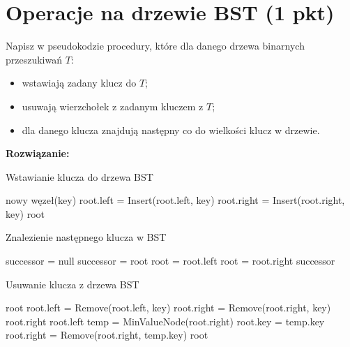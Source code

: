 \documentclass[12pt]{article}
\begin{document}
	\section{Operacje na drzewie BST (1 pkt)}
    Napisz w pseudokodzie procedury, które dla danego drzewa binarnych przeszukiwań \( T \):
\begin{itemize}
    \item wstawiają zadany klucz do \( T \);
    \item usuwają wierzchołek z zadanym kluczem z \( T \);
    \item dla danego klucza znajdują następny co do wielkości klucz w drzewie.
\end{itemize}
	\textcolor{tokyoNightGreen}{\textbf{\large Rozwiązanie:}}
\begin{algorithm}
\caption{Wstawianie klucza do drzewa BST}
\begin{algorithmic}[1]
        \State \Return nowy węzeł(key)
    \EndIf
        \State root.left = Insert(root.left, key)
    \Else
            \State root.right = Insert(root.right, key)
        \EndIf
    \EndIf
    \State \Return root
\EndFunction
\end{algorithmic}
\end{algorithm}

\begin{algorithm}
\caption{Znalezienie następnego klucza w BST}
\begin{algorithmic}[1]
    \State successor = null
            \State successor = root
            \State root = root.left
        \Else
            \State root = root.right
        \EndIf
    \EndWhile
    \State \Return successor
\EndFunction
\end{algorithmic}
\end{algorithm}

\begin{algorithm}
\caption{Usuwanie klucza z drzewa BST}
\begin{algorithmic}[1]
        \State \Return root
    \EndIf
        \State root.left = Remove(root.left, key)
    \Else
            \State root.right = Remove(root.right, key)
        \Else
                \State \Return root.right
            \Else
                    \State \Return root.left
                \EndIf
            \EndIf
            \State temp = MinValueNode(root.right)
            \State root.key = temp.key
            \State root.right = Remove(root.right, temp.key)
        \EndIf
    \EndIf
    \State \Return root
\EndFunction
\end{algorithmic}
\end{algorithm}
\newpage
\end{document}
